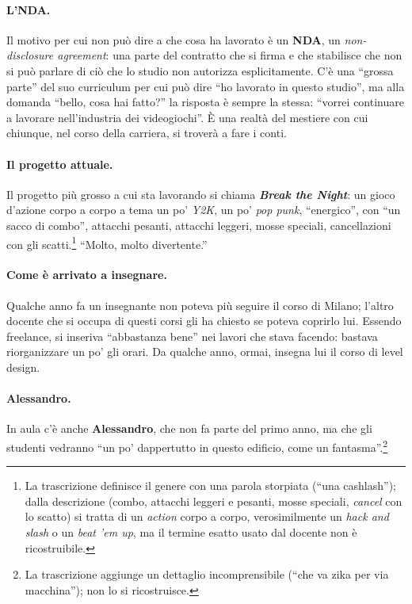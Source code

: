 \paragraph{L'NDA.} Il motivo per cui non può dire a che cosa ha lavorato è
un \textbf{NDA}, un \emph{non-disclosure agreement}: una parte del contratto
che si firma e che stabilisce che non si può parlare di ciò che lo studio non
autorizza esplicitamente. C'è una ``grossa parte'' del suo curriculum per cui
può dire ``ho lavorato in questo studio'', ma alla domanda ``bello, cosa hai
fatto?'' la risposta è sempre la stessa: ``vorrei continuare a lavorare
nell'industria dei videogiochi''. È una realtà del mestiere con cui chiunque,
nel corso della carriera, si troverà a fare i conti.

\paragraph{Il progetto attuale.} Il progetto più grosso a cui sta lavorando
si chiama \textbf{\emph{Break the Night}}: un gioco d'azione corpo a corpo a
tema un po' \emph{Y2K}, un po' \emph{pop punk}, ``energico'', con ``un sacco
di combo'', attacchi pesanti, attacchi leggeri, mosse speciali, cancellazioni
con gli scatti.\footnote{La trascrizione definisce il genere con una parola
storpiata (``una cashlash''); dalla descrizione (combo, attacchi leggeri e
pesanti, mosse speciali, \emph{cancel} con lo scatto) si tratta di un
\emph{action} corpo a corpo, verosimilmente un \emph{hack and slash} o un
\emph{beat 'em up}, ma il termine esatto usato dal docente non è
ricostruibile.} ``Molto, molto divertente.''

\paragraph{Come è arrivato a insegnare.} Qualche anno fa un insegnante non
poteva più seguire il corso di Milano; l'altro docente che si occupa di questi
corsi gli ha chiesto se poteva coprirlo lui. Essendo freelance, si inseriva
``abbastanza bene'' nei lavori che stava facendo: bastava riorganizzare un po'
gli orari. Da qualche anno, ormai, insegna lui il corso di level design.

\paragraph{Alessandro.} In aula c'è anche \textbf{Alessandro}, che non fa
parte del primo anno, ma che gli studenti vedranno ``un po' dappertutto in
questo edificio, come un fantasma''.\footnote{La trascrizione aggiunge un
dettaglio incomprensibile (``che va zika per via macchina''); non lo si
ricostruisce.}

